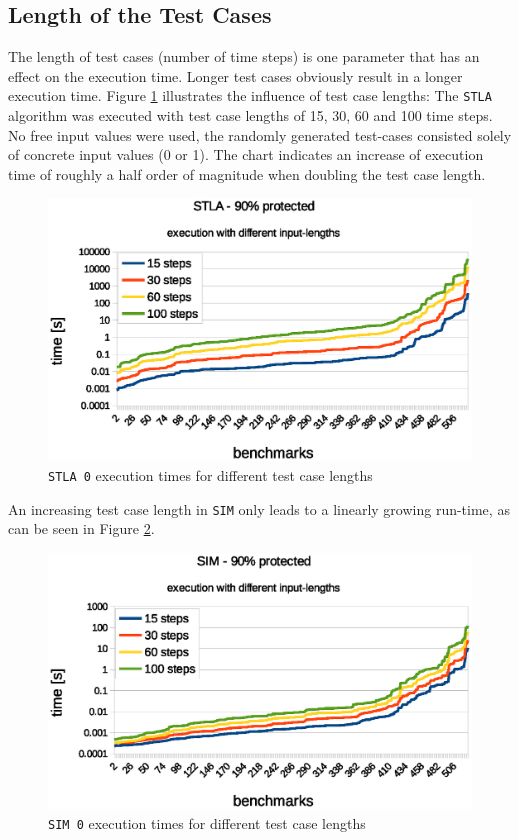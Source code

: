 \documentclass[a4paper,10pt]{article}
\begin{document}
\subsection{Length of the Test Cases}
The length of test cases (number of time steps) is one parameter that has an effect on the execution time. Longer test cases obviously result in a longer execution time.
Figure \ref{stla_input_length_chart} illustrates the influence of test case lengths: The \texttt{STLA} algorithm was executed with test case lengths of 15, 30, 60 and 100 time steps. 
No free input values were used, the randomly generated test-cases consisted solely of concrete input values (0 or 1).
The chart indicates an increase of execution time of roughly a half order of magnitude when doubling the test case length.

\begin{figure}[!htb]
\centering
\includegraphics[scale = 0.6]{img/stla_input_length_chart.eps}
\centering \caption{\texttt{STLA 0} execution times for different test case lengths} 
\label{stla_input_length_chart}
\end{figure}

An increasing test case length in \texttt{SIM} only leads to a linearly growing run-time, as can be seen in Figure \ref{sim_input_length_chart}.

\begin{figure}[!htb]
\centering
\includegraphics[scale = 0.6]{img/sim_input_length_chart.eps}
\centering \caption{\texttt{SIM 0} execution times for different test case lengths} 
\label{sim_input_length_chart}
\end{figure}
\end{document}
